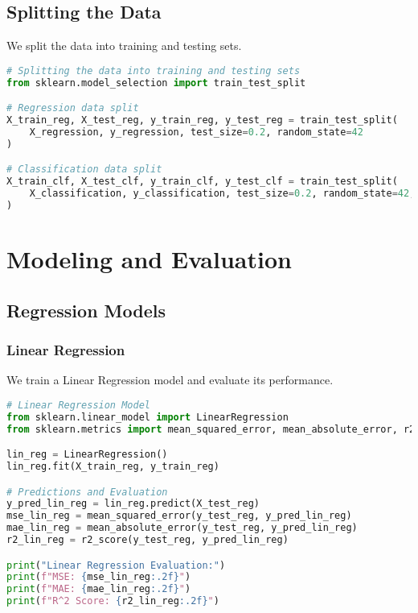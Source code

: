 \documentclass{article}
\begin{document}
\subsection{Splitting the Data}

We split the data into training and testing sets.

\begin{lstlisting}[language=Python]
# Splitting the data into training and testing sets
from sklearn.model_selection import train_test_split

# Regression data split
X_train_reg, X_test_reg, y_train_reg, y_test_reg = train_test_split(
    X_regression, y_regression, test_size=0.2, random_state=42
)

# Classification data split
X_train_clf, X_test_clf, y_train_clf, y_test_clf = train_test_split(
    X_classification, y_classification, test_size=0.2, random_state=42, stratify=y_classification
)
\end{lstlisting}

\section{Modeling and Evaluation}

\subsection{Regression Models}

\subsubsection{Linear Regression}

We train a Linear Regression model and evaluate its performance.

\begin{lstlisting}[language=Python]
# Linear Regression Model
from sklearn.linear_model import LinearRegression
from sklearn.metrics import mean_squared_error, mean_absolute_error, r2_score

lin_reg = LinearRegression()
lin_reg.fit(X_train_reg, y_train_reg)

# Predictions and Evaluation
y_pred_lin_reg = lin_reg.predict(X_test_reg)
mse_lin_reg = mean_squared_error(y_test_reg, y_pred_lin_reg)
mae_lin_reg = mean_absolute_error(y_test_reg, y_pred_lin_reg)
r2_lin_reg = r2_score(y_test_reg, y_pred_lin_reg)

print("Linear Regression Evaluation:")
print(f"MSE: {mse_lin_reg:.2f}")
print(f"MAE: {mae_lin_reg:.2f}")
print(f"R^2 Score: {r2_lin_reg:.2f}")
\end{lstlisting}
\end{document}
